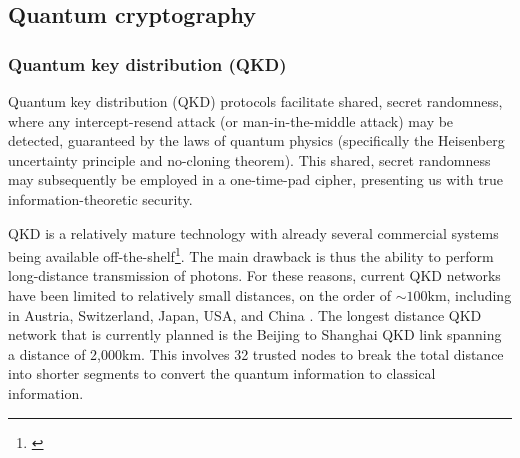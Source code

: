 %
%

\subsection{Quantum cryptography}

%
%

\subsubsection{Quantum key distribution (QKD)} \label{sec:QKD} 


Quantum key distribution (QKD) protocols facilitate shared, secret randomness, where any intercept-resend attack (or man-in-the-middle attack) may be detected, guaranteed by the laws of quantum physics (specifically the Heisenberg uncertainty principle and no-cloning theorem). This shared, secret randomness may subsequently be employed in a one-time-pad cipher, presenting us with true information-theoretic security.

QKD is a relatively mature technology with already several commercial systems being available off-the-shelf\footnote{\cite{??? example companies}}. The main drawback is thus the ability to perform long-distance transmission of photons. For these reasons, current QKD networks have been limited to relatively small distances, on the order of $\sim100$km, including in Austria, Switzerland, Japan, USA, and China \cite{bib:lo2014secure}. The longest distance QKD network that is currently planned is the Beijing to Shanghai QKD link spanning a distance of 2,000km. This involves 32 trusted nodes to break the total distance into shorter segments to convert the quantum information to classical information.

